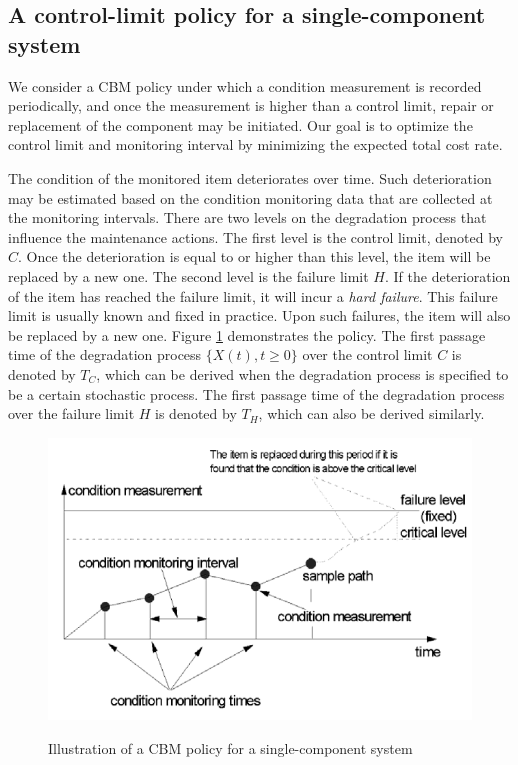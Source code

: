 \documentclass[10pt,a4paper]{article}
\theoremstyle{remark}
\begin{document}
\subsection{A control-limit policy for a single-component system}
We consider a CBM policy under which a condition measurement is recorded periodically, and once the measurement is higher than a control limit, repair or replacement of the component may be initiated. Our goal is to optimize the control limit and monitoring interval by minimizing the expected total cost rate.

The condition of the monitored item deteriorates over time. Such deterioration may be estimated based on the condition monitoring data that are collected at the monitoring intervals. There are two levels on the degradation process that influence the maintenance actions. The first level is the control limit, denoted by $C$. Once the deterioration is equal to or higher than this level, the item will be replaced by a new one. The second level is the failure limit $H$. If the deterioration of the item has reached the failure limit, it will incur a \textit{hard failure}. This failure limit is usually known and fixed in practice. Upon such failures, the item will also be replaced by a new one. Figure \ref{pic:degradation3} demonstrates the policy. The first passage time of the degradation process $\{X(t),t\geq 0\}$ over the control limit $C$ is denoted by $T_{C}$, which can be derived when the degradation process is specified to be a certain stochastic process. The first passage time of the degradation process over the failure limit $H$ is denoted by $T_{H}$, which can also be derived similarly.

\begin{figure}[h!!!]  %
  \centering
  \includegraphics[width=6in]{Degradation3.png}\\
  \footnotesize
  \caption{ \footnotesize{Illustration of a CBM policy for a single-component system} }\label{pic:degradation3}
\end{figure} 
\end{document}
